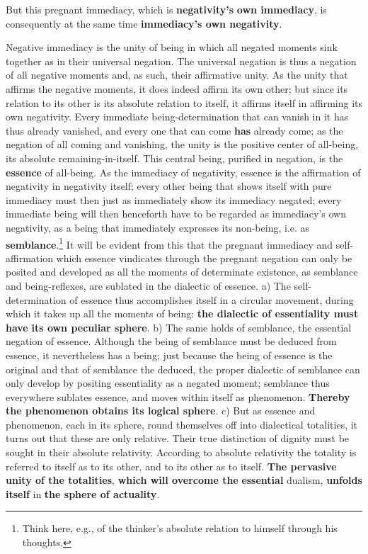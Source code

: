 \documentclass[12pt,a4paper,openany]{book}
\newcommand{\opage}[1]{\marginnote{\footnotesize\textit{[#1]}}}
\begin{document}
But this pregnant immediacy, which is \textbf{negativity's} \textbf{own immediacy}, is consequently at the same time \textbf{immediacy's own negativity}.

Negative immediacy is the unity of being in which all negated moments sink together as in their universal negation. The universal negation is thus a negation of all negative moments and, as such, their affirmative unity. As the unity that affirms the negative moments, it does indeed affirm its own other; but since its relation to its other is its absolute relation to itself, it affirms itself in affirming its own negativity. Every
\setcounter{footnote}{0}%
\opage{92}immediate being-determination that can vanish in it has thus already vanished, and every one that can come \textbf{has} already come; as the negation of all coming and vanishing, the unity is the positive center of all-being, its absolute remaining-in-itself. This central being, purified in negation, is the \textbf{essence} of all-being. As the immediacy of negativity, essence is the affirmation of negativity in negativity itself; every other being that shows itself with pure immediacy must then just as immediately show its immediacy negated; every immediate being will then henceforth have to be regarded as immediacy's own negativity, as a being that immediately expresses its non-being, i.e. as \textbf{semblance}.\footnote{Think here, e.g., of the thinker's absolute relation to himself through his thoughts.}
 It will be evident from this that the pregnant immediacy and self-affirmation which essence vindicates through the pregnant negation can only be posited and developed as all the moments of determinate existence, as semblance and being-reflexes, are sublated in the dialectic of essence.
a) The self-determination of essence thus accomplishes itself in a
circular movement, during which it takes up all the moments of being: \textbf{the dialectic of essentiality must have} \textbf{its own peculiar sphere}. b) The same holds of semblance, the essential negation of essence. Although the being of semblance must be deduced from essence, it nevertheless has a being; just because the being of essence is the original and that of semblance the deduced, the proper dialectic of semblance can only develop by positing essentiality as a negated moment; semblance thus everywhere sublates essence, and
\setcounter{footnote}{0}%
\opage{93}moves within itself as phenomenon. \textbf{Thereby} \textbf{the phenomenon obtains its logical sphere}. c) But as essence and phenomenon, each in its sphere, round themselves off into dialectical totalities, it turns out that these are only relative. Their true distinction of dignity must be sought in their absolute relativity. According to absolute relativity the totality is referred to itself as to its other, and to its other as to itself. \textbf{The pervasive unity of the totalities}, \textbf{which will overcome the} \textbf{essential} dualism, \textbf{unfolds itself} in \textbf{the sphere of actuality}.
\end{document}
